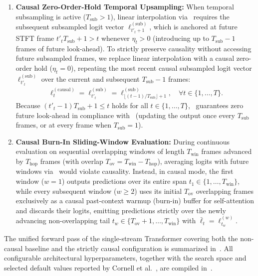\documentclass[lettersize,journal]{IEEEtran}
\begin{document}
\begin{enumerate}
  \item \textbf{Causal Zero-Order-Hold Temporal Upsampling:} When temporal subsampling is active ($T_{\mathrm{sub}} > 1$), linear interpolation via~ requires the subsequent subsampled logit vector $\bm{\ell}_{t'_t + 1}^{(\mathrm{sub})}$, which is anchored at future \gls{STFT} frame $t'_t T_{\mathrm{sub}} + 1 > t$ whenever $\eta_t > 0$ (introducing up to $T_{\mathrm{sub}} - 1$ frames of future look-ahead). To strictly preserve causality without accessing future subsampled frames, we replace linear interpolation with a causal zero-order hold ($\eta_t = 0$), repeating the most recent causal subsampled logit vector $\bm{\ell}_{t'_t}^{(\mathrm{sub})}$ over the current and subsequent $T_{\mathrm{sub}} - 1$ frames:
  \begin{align}
    \bm{\ell}_t^{(\mathrm{causal})} = \bm{\ell}_{t'_t}^{(\mathrm{sub})} = \bm{\ell}_{\lfloor (t-1)/T_{\mathrm{sub}} \rfloor + 1}^{(\mathrm{sub})}, \quad \forall t \in \{1, \dots, T\}.
    \label{eq:causal_upsampling}
  \end{align}
  Because $(t'_t - 1)T_{\mathrm{sub}} + 1 \le t$ holds for all $t \in \{1, \dots, T\}$,~ guarantees zero future look-ahead in compliance with~ (updating the output once every $T_{\mathrm{sub}}$ frames, or at every frame when $T_{\mathrm{sub}} = 1$).

  \item \textbf{Causal Burn-In Sliding-Window Evaluation:} During continuous evaluation on sequential overlapping windows of length $T_{\mathrm{win}}$ frames advanced by $T_{\mathrm{hop}}$ frames (with overlap $T_{\mathrm{ov}} = T_{\mathrm{win}} - T_{\mathrm{hop}}$), averaging logits with future windows via~ would violate causality. Instead, in causal mode, the first window ($w = 1$) outputs predictions over its entire span $t_1 \in \{1, \dots, T_{\mathrm{win}}\}$, while every subsequent window ($w \ge 2$) uses its initial $T_{\mathrm{ov}}$ overlapping frames exclusively as a causal past-context warmup (burn-in) buffer for self-attention and discards their logits, emitting predictions strictly over the newly advancing non-overlapping tail $t_w \in \{T_{\mathrm{ov}}+1, \dots, T_{\mathrm{win}}\}$ with $\bar{\bm{\ell}}_t = \bm{\ell}_{t_w}^{(w)}$.
\end{enumerate}

The unified forward pass of the single-stream Transformer covering both the non-causal baseline and the strictly causal configuration is summarized in~. All configurable architectural hyperparameters, together with the search space and selected default values reported by Cornell et al.~\cite{cornell2022overlapped}, are compiled in~.
\end{document}
